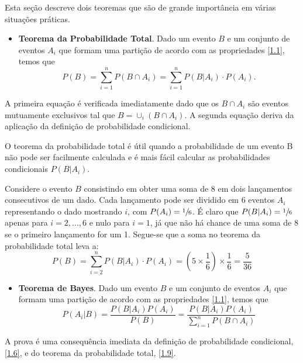 Esta seção descreve dois teoremas que são de grande importância em várias situações práticas.
\begin{itemize}[noitemsep]
\item \textbf{Teorema da Probabilidade Total}. Dado um evento $B$ e um conjunto de eventos  $A_i$ que formam uma partição de acordo com as propriedades \eqref{1.1}, temos que
\begin{equation}\label{1.9}
P(B) = \sum_{i=1}^{n} P(B \cap A_i) = \sum_{i=1}^{n} P(B|A_i) \cdot P(A_i).
\end{equation}
\end{itemize}
A primeira equação é verificada imediatamente dado que os $B \cap A_i$ são eventos mutuamente exclusivos tal que $B = \cup_i (B \cap A_i)$. A segunda equação deriva da aplicação da definição de probabilidade condicional.

O teorema da probabilidade total é útil quando a probabilidade de um evento B não pode ser facilmente calculada e é mais fácil calcular as probabilidades condicionais $P(B|A_i)$.

\begin{exemplo}{}{}
Considere o evento $B$ consistindo em obter uma soma de 8 em dois lançamentos consecutivos de um dado. Cada lançamento pode ser dividido em 6 eventos $A_i$ representando o dado mostrando $i$, com $P(A_i) = \sfrac{1}{6}$. É claro que $P(B|A_i) = \sfrac{1}{6}$ apenas para $i = 2, \ldots, 6$ e nulo para $i = 1$, já que não há chance de uma soma de 8 se o primeiro lançamento for um 1. Segue-se que a soma no teorema da probabilidade total leva a:
\begin{equation*}
P(B) = \sum_{i=2}^{n} P(B|A_i) \cdot P(A_i) = \left(5 \times \frac{1}{6}\right) \times \frac{1}{6} = \frac{5}{36}
\end{equation*}
\end{exemplo}

\begin{itemize}[noitemsep]
	\item \textbf{Teorema de Bayes}. Dado um evento $B$ e um conjunto de eventos  $A_i$ que formam uma partição de acordo com as propriedades \eqref{1.1}, temos que
\begin{equation}
P(A_i | B) = \dfrac{P(B | A_i) P(A_i)}{P(B)} =  \dfrac{P(B | A_i)P(A_i)}{\sum_{i=1}^{n} P(B \cap A_i)}
\end{equation}
\end{itemize}
A prova é uma consequência imediata da definição de probabilidade condicional, \autoref{1.6}, e do teorema da probabilidade total, \autoref{1.9}.

